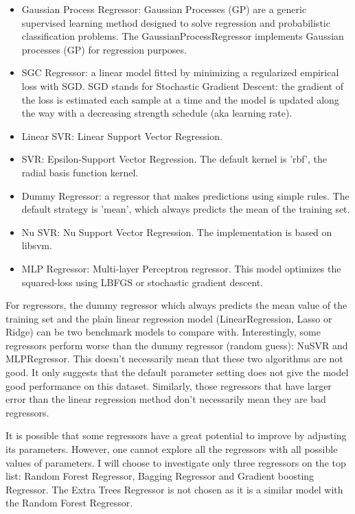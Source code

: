 \documentclass[a4paper]{article}
\begin{document}
\begin{itemize}
					\item Gaussian Process Regressor: Gaussian Processes (GP) are a generic supervised learning method designed to solve regression and probabilistic classification problems. The GaussianProcessRegressor implements Gaussian processes (GP) for regression purposes.
					
					\item SGC Regressor: a linear model fitted by minimizing a regularized empirical loss with SGD. SGD stands for Stochastic Gradient Descent: the gradient of the loss is estimated each sample at a time and the model is updated along the way with a decreasing strength schedule (aka learning rate).
					
					\item Linear SVR: Linear Support Vector Regression.
					
					\item SVR: Epsilon-Support Vector Regression. The default kernel is 'rbf', the radial basis function kernel.
					
					\item Dummy Regressor: a regressor that makes predictions using simple rules. The default strategy is 'mean', which always predicts the mean of the training set.
					
					\item Nu SVR: Nu Support Vector Regression. The implementation is based on libsvm.
					
					\item MLP Regressor: Multi-layer Perceptron regressor. This model optimizes the squared-loss using LBFGS or stochastic gradient descent.
				\end{itemize}
				
				For regressors, the dummy regressor which always predicts the mean value of the training set and the plain linear regression model (LinearRegression, Lasso or Ridge) can be two benchmark models to compare with. Interestingly, some regressors perform worse than the dummy regressor (random guess): NuSVR and MLPRegressor. This doesn't necessarily mean that these two algorithms are not good. It only suggests that the default parameter setting does not give the model good performance on this dataset. Similarly, those regressors that have larger error than the linear regression method don't necessarily mean they are bad regressors. 
				
				It is possible that some regressors have a great potential to improve by adjusting its parameters. However, one cannot explore all the regressors with all possible values of parameters. I will choose to investigate only three regressors on the top list: Random Forest Regressor, Bagging Regressor and Gradient boosting Regressor. The Extra Trees Regressor is not chosen as it is a similar model with the Random Forest Regressor.
				
\end{document}
